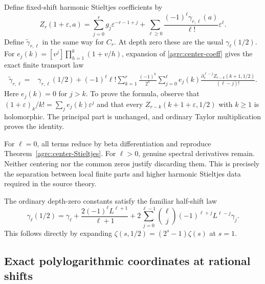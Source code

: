 \documentclass[11pt]{article}
\numberwithin{equation}{section}
\theoremstyle{definition}\newtheorem{definition}[theorem]{Definition}
\theoremstyle{remark}\newtheorem{remark}[theorem]{Remark}
\begin{document}
Define fixed-shift harmonic Stieltjes coefficients by
\begin{equation}\label{agrc:harmonic-Stieltjes}
 Z_r(1+\varepsilon,a)=
 \sum_{j=0}^r g_j\varepsilon^{-r-1+j}
 +\sum_{\ell\geq0}\frac{(-1)^\ell\gamma_{r,\ell}(a)}{\ell!}
                                             \varepsilon^\ell.
\end{equation}
Define $\widetilde\gamma_{r,\ell}$ in the same way for $C_r$.
At depth zero these are the usual $\gamma_\ell(1/2)$.
For $e_j(k)=[v^j]\prod_{h=1}^k(1+v/h)$, expansion of
\eqref{agrc:center-coeff} gives the exact finite transport law
\begin{align}
 \widetilde\gamma_{r,\ell}
 ={}&\gamma_{r,\ell}(1/2)
 +(-1)^\ell\ell!\sum_{k=1}^r\frac{(-1)^k}{2^k}
       \sum_{j=0}^{\ell}e_j(k)
     \frac{\partial_s^{\ell-j}Z_{r-k}(k+1,1/2)}{(\ell-j)!}.
 \label{agrc:Stieltjes-transport}
\end{align}
Here $e_j(k)=0$ for $j>k$. To prove the formula, observe that
$(1+\varepsilon)_k/k!=\sum_j e_j(k)\varepsilon^j$ and that every
$Z_{r-k}(k+1+\varepsilon,1/2)$ with $k\geq1$ is holomorphic.
The principal part is unchanged, and ordinary Taylor multiplication
proves the identity.

For $\ell=0$, all terms reduce by beta differentiation and reproduce
Theorem~\ref{agrc:center-Stieltjes}. For $\ell>0$, genuine spectral
derivatives remain. Neither centering nor the common zeros justify
discarding them. This is precisely the separation between local finite
parts and higher harmonic Stieltjes data required in the source theory.

The ordinary depth-zero constants satisfy the familiar half-shift law
\begin{equation}\label{agrc:half-Stieltjes}
 \gamma_\ell(1/2)=\gamma_\ell
 +\frac{2(-1)^\ell L^{\ell+1}}{\ell+1}
 +2\sum_{j=0}^{\ell-1}\binom{\ell}{j}
                       (-1)^{\ell+j}L^{\ell-j}\gamma_j.
\end{equation}
This follows directly by expanding
$\zeta(s,1/2)=(2^s-1)\zeta(s)$ at $s=1$.

\subsection{Exact polylogarithmic coordinates at rational shifts}
\end{document}
